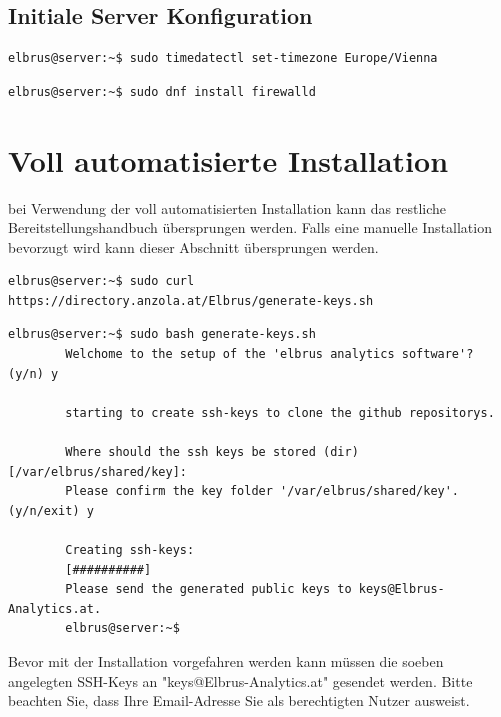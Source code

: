 \documentclass{article}
\begin{document}
	\subsection{Initiale Server Konfiguration}

	\lstset{style=commands}
	\begin{lstlisting}[caption={Setzen der Zeitzone auf 'Europa/Wien'.}]
		elbrus@server:~$ sudo timedatectl set-timezone Europe/Vienna
	\end{lstlisting}

	\lstset{style=commands}
	\begin{lstlisting}[caption={Installieren von dem 'firewalld' Service.}]
		elbrus@server:~$ sudo dnf install firewalld
	\end{lstlisting}
	\newpage
	
	\section{Voll automatisierte Installation}
	bei Verwendung der voll automatisierten Installation kann das restliche Bereitstellungshandbuch übersprungen werden. Falls eine manuelle Installation bevorzugt wird kann dieser Abschnitt übersprungen werden.
	
	\lstset{style=commands}
	\begin{lstlisting}[caption={Installieren des 'generate-keys' Script.}]
		elbrus@server:~$ sudo curl https://directory.anzola.at/Elbrus/generate-keys.sh
	\end{lstlisting}

	\lstset{style=commands}
	\begin{lstlisting}[caption={Ausführen des 'generate-keys' Script.}]
		elbrus@server:~$ sudo bash generate-keys.sh
		Welchome to the setup of the 'elbrus analytics software'? (y/n) y
		
		starting to create ssh-keys to clone the github repositorys.
		
		Where should the ssh keys be stored (dir) [/var/elbrus/shared/key]:
		Please confirm the key folder '/var/elbrus/shared/key'. (y/n/exit) y
		
		Creating ssh-keys:
		[##########]
		Please send the generated public keys to keys@Elbrus-Analytics.at.
		elbrus@server:~$
	\end{lstlisting}
	
	Bevor mit der Installation vorgefahren werden kann müssen die soeben angelegten SSH-Keys an "keys@Elbrus-Analytics.at" gesendet werden. Bitte beachten Sie, dass Ihre Email-Adresse Sie als berechtigten Nutzer ausweist.
	\newpage
	
\end{document}
